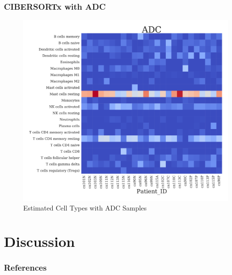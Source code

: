 \documentclass{beamer}
\begin{document}
    \begin{frame}
        \frametitle{CIBERSORTx with ADC}

        \begin{figure}
            \includegraphics[width=0.6 \linewidth]{figures/CIBERSORTx/ADC.Bowtie2.CibersortX.pdf}
            \caption{Estimated Cell Types with ADC Samples}
        \end{figure}
    \end{frame}

    \section{Discussion}

    \begin{frame}[allowframebreaks]
        \frametitle{References}
        
        
    \end{frame}
\end{document}
